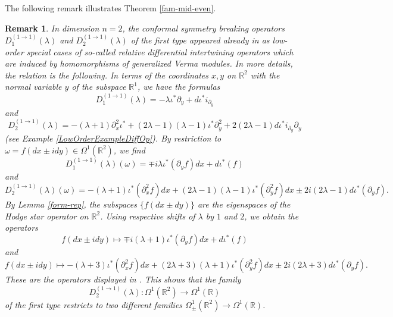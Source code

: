 \documentclass[a4paper,12pt,reqno]{amsart}
\newtheorem{bem}[theorem]{Remark}
\numberwithin{theorem}{subsection}
\numberwithin{equation}{section}
\begin{document}
The following remark illustrates Theorem \ref{fam-mid-even}.

\begin{bem}\label{history} In dimension $n=2$, the conformal symmetry breaking operators
$D_1^{(1 \to 1)}(\lambda)$ and $D_2^{(1 \to 1)}(\lambda)$ of the first type
appeared already in \cite[Equations (8.200)--(8.202)]{Juhl0} as low-order
special cases of so-called relative differential intertwining operators which
are induced by homomorphisms of generalized Verma modules. In more details, the
relation is the following. In terms of the coordinates $x,y$ on ${\mathbb{R}}^2$ with the
normal variable $y$ of the subspace ${\mathbb{R}}^1$, we have the formulas
$$
   D_1^{(1 \to 1)}(\lambda) = -\lambda \iota^* \partial_y + {d} \iota^* i_{\partial_y}
$$
and
$$
   D_2^{(1 \to 1)}(\lambda) = -(\lambda\!+\!1) \partial_x^2 \iota^* +
   (2\lambda\!-\!1)(\lambda\!-\!1) \iota^* \partial_y^2 + 2(2\lambda\!-\!1) {d} \iota^* i_{\partial_y} \partial_y
$$
(see Example \ref{LowOrderExampleDiffOp}). By restriction to $\omega = f (dx
\pm i dy) \in \Omega^1({\mathbb{R}}^2)$, we find
$$
   D_1^{(1 \to 1)}(\lambda)(\omega) = \mp i \lambda \iota^* (\partial_y f) dx + {d} \iota^* (f)
$$
and
$$
   D_2^{(1 \to 1)}(\lambda) (\omega) = -(\lambda\!+\!1) \iota^* (\partial_x^2 f) dx +
   (2\lambda\!-\!1)(\lambda\!-\!1) \iota^* (\partial_y^2 f) dx \pm 2 i(2\lambda\!-\!1) {d} \iota^* (\partial_y f).
$$
By Lemma \ref{form-rep}, the subspaces $\{f (dx \pm dy)\}$ are the eigenspaces
of the Hodge star operator on ${\mathbb{R}}^2$. Using respective shifts of $\lambda$ by
$1$ and $2$, we obtain the operators
$$
   f (dx \pm i dy) \mapsto \mp i (\lambda+1) \iota^* (\partial_y f) dx + {d} \iota^* (f)
$$
and
$$
   f (dx \pm i dy) \mapsto -(\lambda\!+\!3) \iota^* (\partial_x^2 f) dx +
   (2\lambda\!+\!3)(\lambda\!+\!1) \iota^* (\partial_y^2 f) dx \pm 2 i(2\lambda+3) {d} \iota^* (\partial_y f).
$$
These are the operators displayed in \cite{Juhl0}. This shows that the family
$$
   D_2^{(1 \to 1)}(\lambda): \Omega^1 ({\mathbb{R}}^2) \to \Omega^1({\mathbb{R}})
$$
of the first type restricts to two different families $\Omega^1_\pm({\mathbb{R}}^2) \to
\Omega^1({\mathbb{R}})$.
\end{bem}
\end{document}
